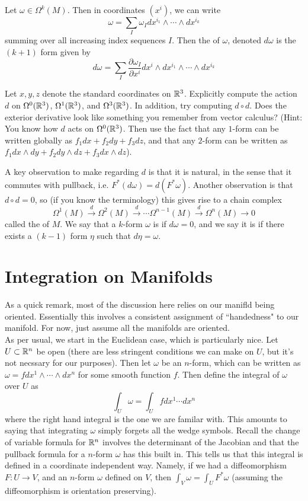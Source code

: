 \begin{defn}
Let $\omega \in \Omega^k(M)$. Then in coordinates $(x^i)$, we can write
$$\omega = \sum_I \omega_I dx^{i_1} \wedge \cdots \wedge dx^{i_k}$$
summing over all increasing index sequences $I$. Then the 
of $\omega$, denoted $d\omega$ is the $(k+1)$ form given by
$$d\omega = \sum_I \frac{\partial \omega_I}{\partial x^i}dx^i \wedge
dx^{i_1} \wedge \cdots \wedge dx^{i_k} $$
\end{defn}
%
\begin{exer}
Let $x,y,z$ denote the standard coordinates on $\mathbb{R}^3$. Explicitly compute
the action $d$ on $\Omega^0(\mathbb{R}^3)$, $\Omega^1(\mathbb{R}^3)$, and $\Omega^3(\mathbb{R}^3)$.
In addition, try computing $d \circ d$. Does the exterior derivative
look like something you remember from vector calculus?
(Hint: You know how $d$ acts on $\Omega^0(\mathbb{R}^3)$. Then use the fact that
any $1$-form can be written globally as $f_1 dx + f_2dy + f_3 dz$, and
that any $2$-form can be written as $f_1 dx \wedge dy + f_2 dy \wedge dz +
f_3 dx \wedge dz$).
\end{exer}
%
A key observation to make regarding $d$ is that it is natural, in the sense
that it commutes with pullback, i.e. $F^*(d\omega) = d(F^*\omega)$. Another
observation is that $d \circ d = 0$, so (if you know the terminology)
this gives rise to a chain complex
$$\Omega^1(M) \xrightarrow{d} \Omega^{2}(M) \xrightarrow{d} \cdots
\Omega^{n-1}(M) \xrightarrow{d} \Omega^n(M) \to 0$$
called the  of $M$. We say that a $k$-form $\omega$ is 
if $d\omega = 0$, and we say it is  if there exists a $(k-1)$ form $\eta$
such that $d\eta = \omega$.
%
\section{Integration on Manifolds}
%
As a quick remark, most of the discussion here relies on our manifld being
oriented. Essentially this involves a consistent assignment of ``handedness"
to our manifold. For now, just assume all the manifolds are oriented. \\

As per usual, we start in the Euclidean case, which is particularly nice. Let
$U \subset \mathbb{R}^n$ be open (there are less stringent conditions we can make on $U$,
but it's not necssary for our purposes). Then let $\omega$ be an $n$-form, which
can be written as $\omega = f dx^1 \wedge \cdots \wedge dx^n$ for some smooth
function $f$. Then define the integral of $\omega$ over $U$ as
$$\int_U \omega = \int_U f dx^1 \cdots dx^n $$
where the right hand integral is the one we are familar with. This amounts
to saying that integrating $\omega$ simply forgets all the wedge symbols. Recall
the change of variable formula for $\mathbb{R}^n$ involves the determinant of the Jacobian
and that the pullback formula for a $n$-form $\omega$ has this built in. This
tells us that this integral is defined in a coordinate independent way. Namely,
if we had a diffeomorphism $F : U \to V$, and an $n$-form $\omega$ defined on $V$,
then $\int_V \omega = \int_U F^*\omega$ (assuming the diffeomorphism
is orientation preserving). \\

